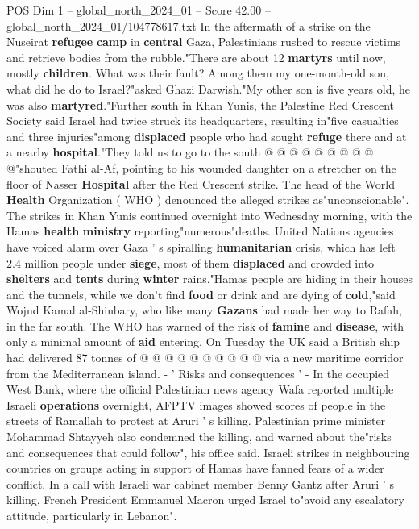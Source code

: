 \begin{textsample}{POS Dim 1 – global\_north\_2024\_01 – Score 42.00 – global\_north\_2024\_01/104778617.txt}
In the aftermath of a strike on the Nuseirat \textbf{refugee} \textbf{camp} in \textbf{central} Gaza, Palestinians rushed to rescue victims and retrieve bodies from the rubble."There are about 12 \textbf{martyrs} until now, mostly \textbf{children}.
What was their fault?
Among them my one-month-old son, what did he do to Israel?"asked Ghazi Darwish."My other son is five years old, he was also \textbf{martyred}."Further south in Khan Yunis, the Palestine Red Crescent Society said Israel had twice struck its headquarters, resulting in"five casualties and three injuries"among \textbf{displaced} people who had sought \textbf{refuge} there and at a nearby \textbf{hospital}."They told us to go to the south @ @ @ @ @ @ @ @ @ @"shouted Fathi al-Af, pointing to his wounded daughter on a stretcher on the floor of Nasser \textbf{Hospital} after the Red Crescent strike.
The head of the World \textbf{Health} Organization ( WHO ) denounced the alleged strikes as"unconscionable".
The strikes in Khan Yunis continued overnight into Wednesday morning, with the Hamas \textbf{health} \textbf{ministry} reporting"numerous"deaths.
United Nations agencies have voiced alarm over Gaza ' s spiralling \textbf{humanitarian} crisis, which has left 2.4 million people under \textbf{siege}, most of them \textbf{displaced} and crowded into \textbf{shelters} and \textbf{tents} during \textbf{winter} rains."Hamas people are hiding in their houses and the tunnels, while we don't find \textbf{food} or drink and are dying of \textbf{cold},"said Wojud Kamal al-Shinbary, who like many \textbf{Gazans} had made her way to Rafah, in the far south.
The WHO has warned of the risk of \textbf{famine} and \textbf{disease}, with only a minimal amount of \textbf{aid} entering.
On Tuesday the UK said a British ship had delivered 87 tonnes of @ @ @ @ @ @ @ @ @ @ via a new maritime corridor from the Mediterranean island. - ' Risks and consequences ' - In the occupied West Bank, where the official Palestinian news agency Wafa reported multiple Israeli \textbf{operations} overnight, AFPTV images showed scores of people in the streets of Ramallah to protest at Aruri ' s killing.
Palestinian prime minister Mohammad Shtayyeh also condemned the killing, and warned about the"risks and consequences that could follow", his office said.
Israeli strikes in neighbouring countries on groups acting in support of Hamas have fanned fears of a wider conflict.
In a call with Israeli war cabinet member Benny Gantz after Aruri ' s killing, French President Emmanuel Macron urged Israel to"avoid any escalatory attitude, particularly in Lebanon".

\end{textsample}
